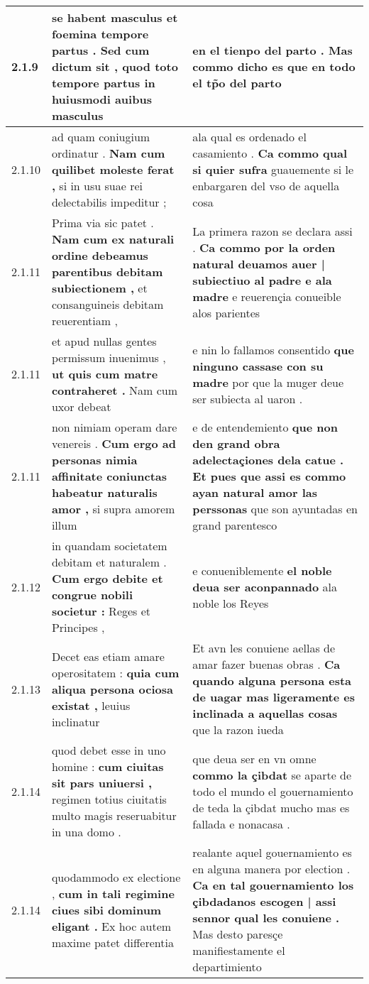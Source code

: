 \begin{tabular}{|p{1cm}|p{6.5cm}|p{6.5cm}|}
2.1.9 & se habent masculus et foemina tempore partus . \textbf{ Sed cum dictum sit , } quod toto tempore partus in huiusmodi auibus masculus & en el tienpo del parto . \textbf{ Mas commo dicho es } que en todo el tp̃o del parto \\\hline
2.1.10 & ad quam coniugium ordinatur . \textbf{ Nam cum quilibet moleste ferat , } si in usu suae rei delectabilis impeditur ; & ala qual es ordenado el casamiento . \textbf{ Ca commo qual si quier sufra } guauemente si le enbargaren del vso de aquella cosa \\\hline
2.1.11 & Prima via sic patet . \textbf{ Nam cum ex naturali ordine debeamus parentibus debitam subiectionem , } et consanguineis debitam reuerentiam , & La primera razon se declara assi . \textbf{ Ca commo por la orden natural deuamos auer | subiectiuo al padre e ala madre } e reuerençia conueible alos parientes \\\hline
2.1.11 & et apud nullas gentes permissum inuenimus , \textbf{ ut quis cum matre contraheret . } Nam cum uxor debeat & e nin lo fallamos consentido \textbf{ que ninguno cassase con su madre } por que la muger deue ser subiecta al uaron . \\\hline
2.1.11 & non nimiam operam dare venereis . \textbf{ Cum ergo ad personas nimia affinitate coniunctas habeatur naturalis amor , } si supra amorem illum & e de entendemiento \textbf{ que non den grand obra adelectaçiones dela catue . Et pues que assi es commo ayan natural amor las perssonas } que son ayuntadas en grand parentesco \\\hline
2.1.12 & in quandam societatem debitam et naturalem . \textbf{ Cum ergo debite et congrue nobili societur : } Reges et Principes , & e conueniblemente \textbf{ el noble deua ser aconpannado } ala noble los Reyes \\\hline
2.1.13 & Decet eas etiam amare operositatem : \textbf{ quia cum aliqua persona ociosa existat , } leuius inclinatur & Et avn les conuiene aellas de amar fazer buenas obras . \textbf{ Ca quando alguna persona esta de uagar mas ligeramente es inclinada a aquellas cosas } que la razon iueda \\\hline
2.1.14 & quod debet esse in uno homine : \textbf{ cum ciuitas sit pars uniuersi , } regimen totius ciuitatis multo magis reseruabitur in una domo . & que deua ser en vn omne \textbf{ commo la çibdat } se aparte de todo el mundo el gouernamiento de teda la çibdat mucho mas es fallada e nonacasa . \\\hline
2.1.14 & quodammodo ex electione , \textbf{ cum in tali regimine ciues sibi dominum eligant . } Ex hoc autem maxime patet differentia & realante aquel gouernamiento es en alguna manera por election . \textbf{ Ca en tal gouernamiento los çibdadanos escogen | assi sennor qual les conuiene . } Mas desto paresçe manifiestamente el departimiento \\\hline

\end{tabular}
